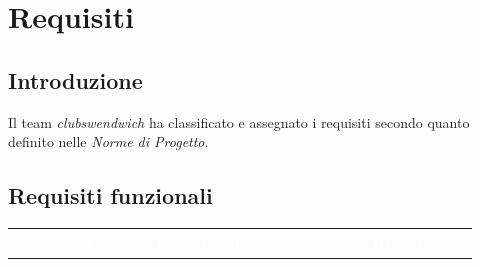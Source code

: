 \section{Requisiti}
\subsection{Introduzione}
Il team \textit{clubswendwich} ha classificato e assegnato i requisiti secondo quanto definito nelle \textit{Norme di Progetto}.
\subsection{Requisiti funzionali}
{\renewcommand{\arraystretch}{1.5}
\begin{longtable}{p{0.12\linewidth}p{0.15\linewidth}p{0.50\linewidth}p{0.15\linewidth}}
	\rowcolor[RGB]{33, 73, 50}
	\textcolor{white}{\textbf{Codice}} & \textcolor{white}{\textbf{Classe}} & \textcolor{white}{\textbf{Descrizione}} &
    \textcolor{white}{\textbf{Riferimenti}}\\


\end{longtable}}
